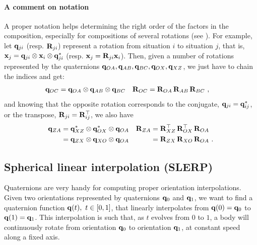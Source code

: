 \paragraph{A comment on notation}
A proper notation helps determining the right order of the factors in the composition, especially for compositions of several rotations (see ).
For example, let ${\bf q}_{ji}$ (resp. ${\bf R}_{ji}$) represent a rotation from situation $i$ to situation $j$, that is, ${\bf x}_j={\bf q}_{ji}\otimes{\bf x}_i\otimes{\bf q}_{ji}^*$ (resp. ${\bf x}_j={\bf R}_{ji}{\bf x}_i$).
Then, given a number of rotations represented by the quaternions ${\bf q}_{OA},{\bf q}_{AB},{\bf q}_{BC},{\bf q}_{OX},{\bf q}_{XZ}$, we just have to chain the indices and get:
%
\begin{align*}
{\bf q}_{OC} &= {\bf q}_{OA}\otimes{\bf q}_{AB}\otimes{\bf q}_{BC}
&
{\bf R}_{OC} &= {\bf R}_{OA}\,{\bf R}_{AB}\,{\bf R}_{BC}
~,
\end{align*}
%
and knowing that the opposite rotation corresponds to the conjugate, ${\bf q}_{ji}={\bf q}_{ij}^*$, or  the transpose, ${\bf R}_{ji}={\bf R}_{ij}^{\top}$, we also have
%
\begin{align*}
{\bf q}_{ZA} &= {\bf q}_{XZ}^*\otimes{\bf q}_{OX}^*\otimes{\bf q}_{OA} 
&
{\bf R}_{ZA} &= {\bf R}_{XZ}^{\top}\,{\bf R}_{OX}^{\top}\,{\bf R}_{OA} 
\\
&= {\bf q}_{ZX}\otimes{\bf q}_{XO}\otimes{\bf q}_{OA}
&
&= {\bf R}_{ZX}\,{\bf R}_{XO}\,{\bf R}_{OA}
~.
\end{align*}




\subsection{Spherical linear interpolation (SLERP)}
\label{sec:slerp}

Quaternions are very handy for computing proper orientation interpolations. 
Given two orientations represented by quaternions ${\bf q}_0$ and ${\bf q}_1$, we want to find a quaternion function ${\bf q}(t),~ t\in[0,1]$, that linearly interpolates from ${\bf q}(0)={\bf q}_0$ to ${\bf q}(1)={\bf q}_1$. 
This interpolation is such that, as $t$ evolves from $0$ to $1$, a body will continuously rotate from orientation ${\bf q}_0$ to orientation ${\bf q}_1$, at constant speed along a fixed axis.

